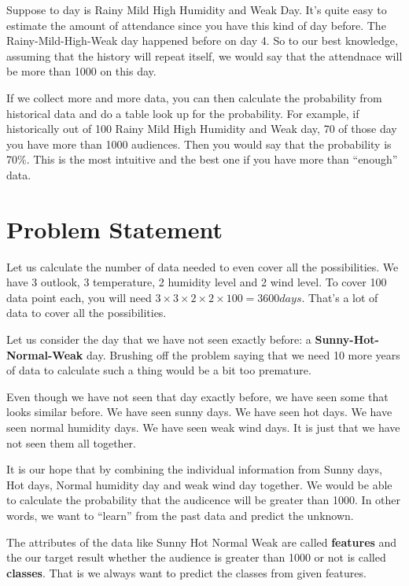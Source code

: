 \documentclass[a4paper, 12pt]{article}
\begin{document}
Suppose to day is Rainy Mild High Humidity and Weak Day. It's quite easy to estimate the amount of attendance since you have this kind of day before. The Rainy-Mild-High-Weak day happened before on day 4. So to our best knowledge, assuming that the history will repeat itself, we would say that the attendnace will be more than \num{1000} on this day.

If we collect more and more data, you can then calculate the probability from historical data and do a table look up for the probability. For example, if historically out of 100 Rainy Mild High Humidity and Weak day, 70 of those day you have more than \num{1000} audiences. Then you would say that the probability is 70\%. This is the most intuitive and the best one if you have more than ``enough'' data.

\section*{Problem Statement}

Let us calculate the number of data needed to even cover all the possibilities. We have 3 outlook, 3 temperature, 2 humidity level and 2 wind level. To cover 100 data point each, you will need $3\times3\times2\times2\times100 = \num{3600} \si{days}$. That's a lot of data to cover all the possibilities.

Let us consider the day that we have not seen exactly before: a \textbf{Sunny-Hot-Normal-Weak} day. Brushing off the problem saying that we need 10 more years of data to calculate such a thing would be a bit too premature. 

Even though we have not seen that day exactly before, we have seen some that looks similar before. We have seen sunny days. We have seen hot days. We have seen normal humidity days. We have seen weak wind days. It is just that we have not seen them all together.

It is our hope that by combining the individual information from Sunny days, Hot days, Normal humidity day and weak wind day together. We would be able to calculate the probability that the audicence will be greater than \num{1000}. In other words, we want to ``learn'' from the past data and predict the unknown.

The attributes of the data like Sunny Hot Normal Weak are called \textbf{features} and the our target result whether the audience is greater than \num{1000} or not is called \textbf{classes}. That is we always want to predict the classes from given features. 
\end{document}
